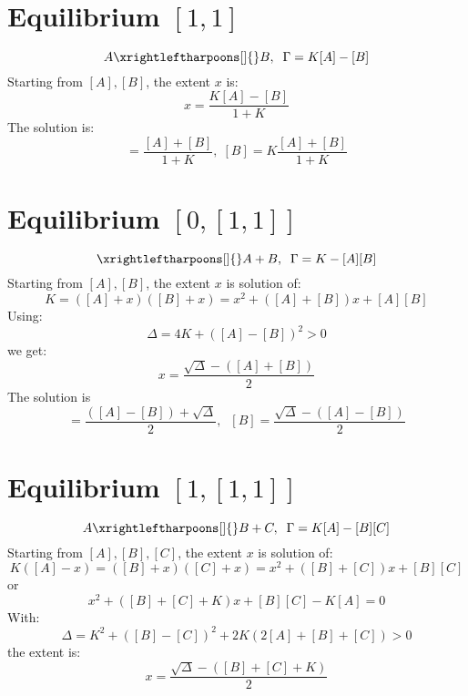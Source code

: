 \documentclass[aps,12pt]{revtex4}
\begin{document}
\section{Equilibrium $[1,1]$}
\begin{equation}
	A \xrightleftharpoons[]{} B, \;\; \Gamma = K[A]-[B]
\end{equation}
Starting from $[A],[B]$, the extent $x$ is:
\begin{equation}
	x = \dfrac{K[A]-[B]}{1+K}
\end{equation}
The solution is:
\begin{equation}
	[A] = \dfrac{[A]+[B]}{1+K}, \; [B] = K \dfrac{ [A]+[B] }{1+K}
\end{equation}


\section{Equilibrium $[0,[1,1]]$}
\begin{equation}
	\xrightleftharpoons[]{} A+B, \;\; \Gamma = K - [A][B]
\end{equation}
Starting from $[A],[B]$, the extent $x$ is solution of:
\begin{equation}
	K = ([A]+x)([B]+x) = x^2 + ([A]+[B])x + [A][B]
\end{equation}
Using:
\begin{equation}
	\Delta = 4K + ([A]-[B])^2 > 0
\end{equation}
we get:
\begin{equation}
	x = \dfrac{\sqrt{\Delta}-([A]+[B])}{2}
\end{equation}
The solution is
\begin{equation}
	[A] =  \dfrac{([A]-[B])+\sqrt{\Delta}}{2},\;\;[B] = \dfrac{\sqrt{\Delta}-([A]-[B])}{2}
\end{equation}

\section{Equilibrium $[1,[1,1]]$}
\begin{equation}
	A\xrightleftharpoons[]{} B+C, \;\; \Gamma = K[A] - [B][C]
\end{equation}
Starting from $[A],[B],[C]$, the extent $x$ is solution of:
\begin{equation}
	K([A]-x) = ([B]+x)([C]+x) = x^2 + ([B]+[C])x + [B][C]
\end{equation}
or
\begin{equation}
	x^2 + ([B]+[C]+K) x + [B][C]-K[A] = 0	
\end{equation}
With:
\begin{equation}
	\Delta = K^2 + ([B]-[C])^2 + 2K(2[A]+[B]+[C]) > 0
\end{equation}
the extent is:
\begin{equation}
	x = \dfrac{\sqrt{\Delta} - ([B]+[C]+K) }{2}
\end{equation}
\end{document}

